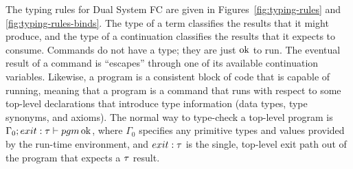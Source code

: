\documentclass{article}
\begin{document}
The typing rules for Dual System FC are given in
Figures~\ref{fig:typing-rules} and \ref{fig:typing-rules-binds}.  The
type of a term classifies the results that it might produce, and the
type of a continuation classifies the results that it expects to
consume.  Commands do not have a type; they are just $\operatorname{ok}$ to run.
The eventual result of a command is ``escapes'' through one of its
available continuation variables.  Likewise, a program is a consistent
block of code that is capable of running, meaning that a program is a
command that runs with respect to some top-level declarations that
introduce type information (data types, type synonyms, and axioms).
The normal way to type-check a top-level program is
$\Gamma_0;exit:\tau \vdash pgm \operatorname{ok}$, where $\Gamma_0$ specifies any
primitive types and values provided by the run-time environment, and
$exit:\tau$ is the single, top-level exit path out of the program that
expects a $\tau$ result.
\end{document}
